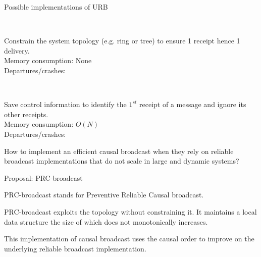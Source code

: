 \documentclass[10pt, xcolor={usenames, dvipsnames}]{beamer}
\newcommand{\cmark}{\ding{51}}
\newcommand{\xmark}{\ding{55}}
\newcommand{\YES}[1]{\textcolor{green}{#1}}
\newcommand{\NO}[1]{\textcolor{red}{#1}}
\begin{document}
\begin{frame}{Possible implementations of URB}
  
  \begin{minipage}{0.49\textwidth}
    \begin{center}
      
    \end{center}
  \end{minipage}~
  \begin{minipage}{0.49\textwidth}
    \begin{center}
      
    \end{center}
  \end{minipage}
  \begin{minipage}{0.49\textwidth}
    \vspace{1em}
    Constrain the system topology (e.g. ring or tree) to ensure 1 receipt hence
    1 delivery.\\
    Memory consumption: None \YES{\cmark}\\
    Departures/crashes: \NO{\xmark}
  \end{minipage}~
  \begin{minipage}{0.49\textwidth}
    \vspace{1em}
    Save control information to identify the $1^{st}$ receipt of a
    message and ignore its other receipts.\\
    Memory consumption: $O(N)$ \NO{\xmark}\\
    Departures/crashes: \YES{\cmark}
  \end{minipage}
  
\end{frame}

\begin{frame}[standout]
  
  How to implement an efficient causal broadcast when they rely on reliable
  broadcast implementations that do not scale in large and dynamic systems?
  
\end{frame}


\begin{frame}{Proposal: PRC-broadcast}

  PRC-broadcast stands for Preventive Reliable Causal broadcast.

  \vspace{1em}
  
  PRC-broadcast exploits the topology without constraining it. It maintains a
  local data structure the size of which does not monotonically increases.

  \vspace{1em}
  
  This implementation of causal broadcast uses the causal order to improve on
  the underlying reliable broadcast implementation.

\end{frame}
\end{document}

